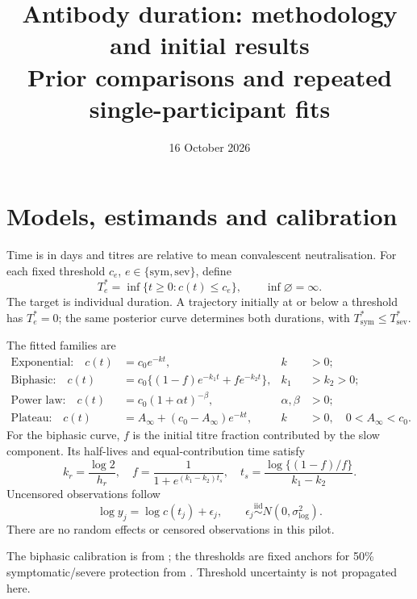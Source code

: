 \documentclass[11pt,a4paper]{article}
\title{\textbf{Antibody duration: methodology and initial results}\\[0.3em]
  \large Prior comparisons and repeated single-participant fits}
\author{}
\date{16 October 2026}
\newcommand{\reporttable}[1]{%
  }
\begin{document}
\maketitle
\vspace{-2em}
\section{Models, estimands and calibration}
Time is in days and titres are relative to mean convalescent neutralisation.
For each fixed threshold $c_e$, $e\in\{\mathrm{sym},\mathrm{sev}\}$, define
\begin{equation}
  T_e^*=\inf\{t\geq0:c(t)\leq c_e\},\qquad \inf\varnothing=\infty.
\end{equation}
The target is individual duration. A trajectory initially at or below a
threshold has $T_e^*=0$; the same posterior curve determines both durations,
with $T_{\mathrm{sym}}^*\leq T_{\mathrm{sev}}^*$.

The fitted families are
\begin{align}
  \text{Exponential:}\quad c(t)&=c_0e^{-kt}, & k&>0;\label{eq:exp}\\
  \text{Biphasic:}\quad c(t)&=c_0\{(1-f)e^{-k_1t}+fe^{-k_2t}\},
    & k_1&>k_2>0;\label{eq:bip}\\
  \text{Power law:}\quad c(t)&=c_0(1+\alpha t)^{-\beta},
    & \alpha,\beta&>0;\label{eq:power}\\
  \text{Plateau:}\quad c(t)&=A_\infty+(c_0-A_\infty)e^{-kt},
    & k&>0,\quad 0<A_\infty<c_0.\label{eq:plateau}
\end{align}
For the biphasic curve, $f$ is the initial titre fraction contributed by
the slow component. Its half-lives and equal-contribution time satisfy
\begin{equation}
  k_r=\frac{\log2}{h_r},\quad
  f=\frac{1}{1+e^{(k_1-k_2)t_s}},\quad
  t_s=\frac{\log\{(1-f)/f\}}{k_1-k_2}.
\end{equation}
Uncensored observations follow
\begin{equation}
  \log y_j=\log c(t_j)+\epsilon_j,\qquad
  \epsilon_j\overset{\mathrm{iid}}\sim N(0,\sigma_{\log}^2).
\end{equation}
There are no random effects or censored observations in this pilot.

\begin{table}[H]
\centering\small
\caption{Generating parameters and fixed analysis anchors. Titres and
thresholds use the convalescent-relative scale.}
\reporttable{calibration}
\label{tab:calibration}
\end{table}
The biphasic calibration is from \textcite{hogan2023}; the thresholds
are fixed anchors for 50\% symptomatic/severe protection from
\textcite{khoury2021}. Threshold uncertainty is not propagated here.
\end{document}
